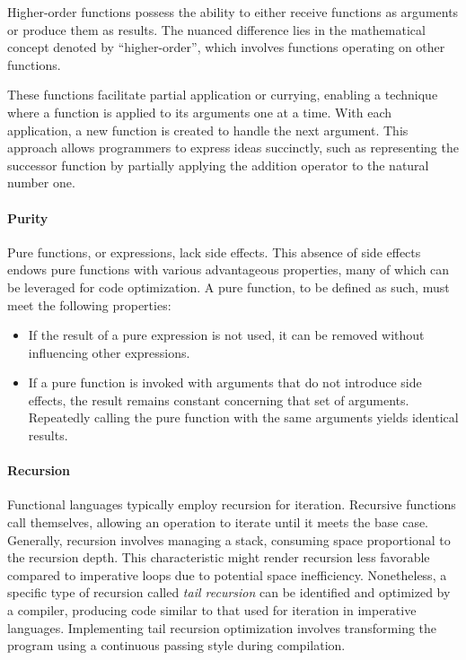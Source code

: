 Higher-order functions possess the ability to either receive functions as arguments or produce them as results. The nuanced difference lies in the mathematical concept denoted by ``higher-order'', which involves functions operating on other functions.

These functions facilitate partial application or currying, enabling a technique where a function is applied to its arguments one at a time. With each application, a new function is created to handle the next argument. This approach allows programmers to express ideas succinctly, such as representing the successor function by partially applying the addition operator to the natural number one.

\paragraph{Purity}
Pure functions, or expressions, lack side effects. This absence of side effects endows pure functions with various advantageous properties, many of which can be leveraged for code optimization. A pure function, to be defined as such, must meet the following properties:

\begin{itemize}
    \item If the result of a pure expression is not used, it can be removed without influencing other expressions.
    \item If a pure function is invoked with arguments that do not introduce side effects, the result remains constant concerning that set of arguments. Repeatedly calling the pure function with the same arguments yields identical results.
\end{itemize}

\paragraph{Recursion}

Functional languages typically employ recursion for iteration. Recursive functions call themselves, allowing an operation to iterate until it meets the base case. Generally, recursion involves managing a stack, consuming space proportional to the recursion depth. This characteristic might render recursion less favorable compared to imperative loops due to potential space inefficiency. Nonetheless, a specific type of recursion called \textit{tail recursion} can be identified and optimized by a compiler, producing code similar to that used for iteration in imperative languages. Implementing tail recursion optimization involves transforming the program using a continuous passing style during compilation.

